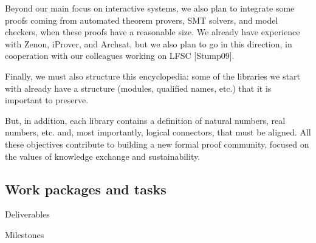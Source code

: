 Beyond our main focus on interactive systems, we also plan to
integrate some proofs coming from automated theorem provers, SMT
solvers, and model checkers, when these proofs have a reasonable
size. We already have experience with Zenon, iProver, and Archsat, but
we also plan to go in this direction, in cooperation with our
colleagues working on LFSC [Stump09].

Finally, we must also structure this encyclopedia: some of the
libraries we start with already have a structure (modules, qualified
names, etc.) that it is important to preserve.

But, in addition, each library contains a definition of natural
numbers, real numbers, etc. and, most importantly, logical connectors,
that must be aligned.  All these objectives contribute to building a
new formal proof community, focused on the values of knowledge
exchange and sustainability.


\subsection{Work packages and tasks}



Deliverables


Milestones

